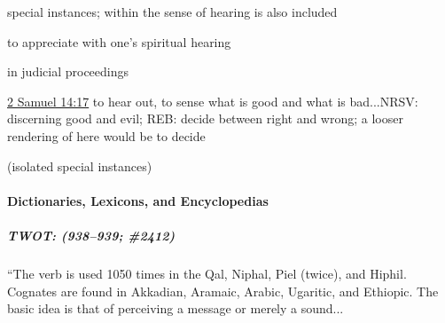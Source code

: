 \begin{compactdesc}
\begin{compactitem}
							\item[6] special instances; within the sense of hearing is also included
							\item[6.a] to appreciate with one's spiritual hearing
							\item[6.b] in judicial proceedings
							\item[6.c]  \hyperref[2SAMUEL-14-17]{2 Samuel 14:17} to hear out, to sense what is good and what is bad...NRSV: discerning good and evil; REB: decide between right and wrong; a looser rendering of  here would be to decide
							\item[7.a] (isolated special instances)
						\end{compactitem}
				\end{compactdesc}
				
				\begin{compactdesc}
					\item[Some OT uses] \textbf{}
						\begin{compactdesc}
							\item[{\hyperref[1SAMUEL-15-22]{1 Samuel 15:22}}]
						\end{compactdesc}
				\end{compactdesc}
				
		\paragraph{Dictionaries, Lexicons, and Encyclopedias}
				
			\subparagraph{TWOT: \texorpdfstring{}{} (938--939; \#2412)}
				\label{SHAMA-TWOT}
				
				``The verb  is used 1050 times in the Qal, Niphal, Piel (twice), and Hiphil. Cognates are found in Akkadian, Aramaic, Arabic, Ugaritic, and Ethiopic. The basic idea is that of perceiving a message or merely a sound...
				
